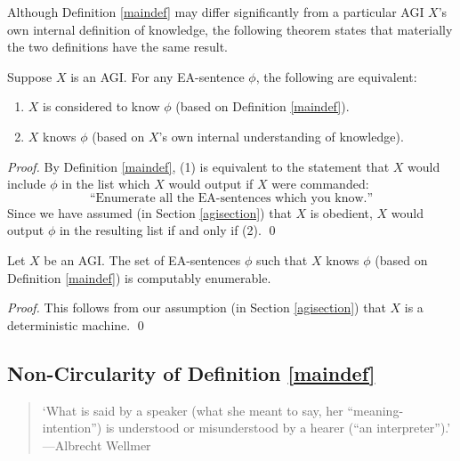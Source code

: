 \documentclass[runningheads]{llncs}
\begin{document}
Although Definition \ref{maindef} may differ significantly from a particular AGI
$X$'s own internal definition of knowledge, the following theorem states that
materially the two definitions have the same result.

\begin{theorem}
\label{sentenceequivalence}
  Suppose $X$ is an AGI. For any EA-sentence $\phi$, the following
  are equivalent:
  \begin{enumerate}
    \item $X$ is
    considered to know $\phi$ (based on Definition \ref{maindef}).
    \item
    $X$ knows $\phi$ (based on $X$'s own internal understanding of
    knowledge).
  \end{enumerate}
\end{theorem}

\begin{proof}
  By Definition \ref{maindef}, (1) is equivalent to the statement that $X$ would
  include $\phi$ in the list which $X$ would output if $X$ were commanded:
  \[
  \text{``Enumerate all the EA-sentences which you know.''}
  \]
  Since we have assumed (in Section \ref{agisection}) that $X$ is obedient,
  $X$ would output
  $\phi$ in the resulting list if and only if (2).
  \qed
\end{proof}

\begin{theorem}
\label{retheorem}
  Let $X$ be an AGI.
  The set of EA-sentences $\phi$ such that $X$ knows $\phi$ (based on
  Definition \ref{maindef}) is computably enumerable.
\end{theorem}

\begin{proof}
  This follows from our assumption (in Section \ref{agisection}) that
  $X$ is a deterministic machine.
  \qed
\end{proof}


\subsection{Non-Circularity of Definition \ref{maindef}}
\label{noncircularsubsection}

\begin{quote}
  `What is said by a speaker (what she meant to say, her ``meaning-intention'')
  is understood or misunderstood by a
  hearer (``an interpreter'').'
  ---Albrecht Wellmer \cite{wellmer2014skepticism}
\end{quote}
\end{document}
